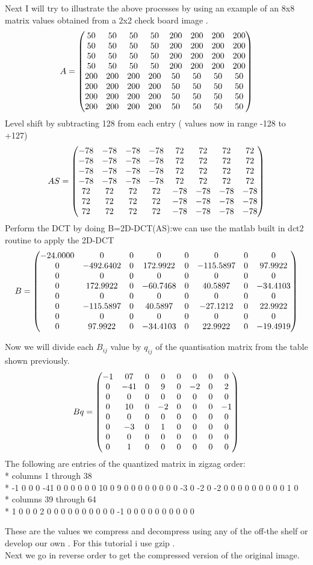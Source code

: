 \documentclass[12pt]{article}
\begin{document}
Next I will try to illustrate the above processes by using an example of  an 8x8 matrix values obtained from a 2x2 check board image .
\[
A=
\begin {pmatrix}
50 &50& 50& 50& 200& 200& 200& 200\cr
50 &50& 50& 50& 200& 200& 200& 200\cr
50 &50 &50 &50 &200& 200 &200 &200\cr
50& 50& 50& 50& 200& 200& 200& 200\cr
200 &200 &200 &200 &50 &50 &50 &50\cr
200 &200& 200& 200& 50& 50& 50& 50\cr
200 &200 &200 &200 &50 &50& 50 &50\cr
200& 200& 200& 200& 50& 50& 50& 50\cr
\end{pmatrix}
\]
Level shift by subtracting 128 from each entry ( values now in range -128 to +127)
\[
AS=
\begin{pmatrix}
-78 &-78& -78& -78& 72& 72& 72& 72\cr
-78 &-78& -78& -78& 72& 72& 72& 72\cr
-78 &-78 &-78 &-78 &72 &72 &72 &72\cr
-78& -78& -78& -78& 72& 72& 72&72\cr
72 & 72 & 72& 72 &-78 &-78 &-78 &-78\cr
72 & 72 & 72 & 72 &-78 &-78 &-78 &-78\cr
72 & 72 & 72 & 72 & -78 & -78& -78 & -78\cr
\end{pmatrix}
\]
Perform the DCT by doing B=2D-DCT(AS):we can use the matlab built in dct2 routine to apply the 2D-DCT
\[
B=
\begin{pmatrix}
-24.0000 & 0 & 0& 0& 0& 0& 0& 0\cr
0& -492.6402 & 0 & 172.9922 & 0 & -115.5897 & 0  & 97.9922\cr
0 &0 &0 &0 &0 &0 &0 &0\cr
0 &172.9922& 0& -60.7468& 0& 40.5897& 0& -34.4103\cr
0 &0 &0 &0 &0 &0 &0 &0\cr
0 &-115.5897& 0& 40.5897& 0& -27.1212& 0& 22.9922\cr
0 &0 &0 &0 &0 &0 &0 &0\cr
0 &97.9922& 0& -34.4103& 0& 22.9922& 0& -19.4919\cr
\end{pmatrix}
\]

Now we will divide each $ B_{ij}$ value by $q_{ij}$ of the quantisation matrix from the table shown previously.
\[
Bq=
\begin {pmatrix}
-1& 07 &0& 0& 0& 0& 0& 0\cr
0 &-41 &0 &9 &0 &-2 &0 &2\cr
0& 0& 0& 0& 0& 0& 0& 0\cr
0 &10 &0 &-2 &0 &0 &0 &-1\cr
0 &0& 0& 0& 0& 0& 0& 0\cr
0 &-3 &0 &1 &0 &0 &0 &0\cr
0 &0& 0& 0& 0& 0& 0& 0\cr
0 &1 &0 &0 &0 &0 &0 &0\cr
\end{pmatrix}
\]
The following are  entries of the quantized matrix in zigzag order:\\*
 columns 1 through 38 \\*
-1 0 0 0 -41 0 0 0 0 0 0 10 0 9 0 0 0 0 0
0 0 0 -3 0 -2  0 -2 0 0 0 0 0 0 0 0 0 1 0\\*
columns 39 through 64\\*
1 0 0 0 2 0 0 0 0 0 0 0 0 0 0 -1 0 0 0
0 0 0 0 0 0 0  

These are  the values  we compress and decompress using any of the off-the shelf or develop our own . For this tutorial i use gzip .
\\
Next we go in reverse order to get the compressed version of the original image.
\end{document}

